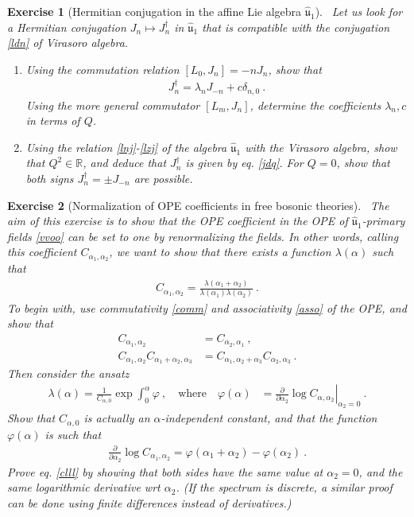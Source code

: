 \documentclass[12pt, a4paper, notitlepage, twoside]{report}
\numberwithin{equation}{section}
\theoremstyle{break}
\newtheorem{exo}{Exercise}[chapter]
\begin{document}
\begin{exo}[Hermitian conjugation in the affine Lie algebra $\hat{\mathfrak{u}}_1$]
~\label{exocuo}
Let us look for a Hermitian conjugation $J_n\mapsto J_n^\dagger$ in $\hat{\mathfrak{u}}_1$ that is compatible with the conjugation \eqref{ldn} of Virasoro algebra.
\begin{enumerate}
 \item Using the commutation relation $[L_0,J_n]=-nJ_n$, show that 
 \begin{align}
  J_n^\dagger =\lambda_n J_{-n} + c\delta_{n,0}\ .
 \end{align}
Using the more general commutator $[L_m,J_n]$, determine the coefficients $\lambda_n,c$ in terms of $Q$. 
\item 
Using the relation \eqref{lnj}-\eqref{lzj} of the algebra $\hat{\mathfrak{u}}_1$ with the Virasoro algebra, show that $Q^2\in\mathbb{R}$, and deduce that $J_n^\dagger$ is given by eq. \eqref{jdq}. For $Q=0$, show that both signs $J_n^\dagger = \pm J_{-n}$ are possible.
\end{enumerate}

\end{exo}


\begin{exo}[Normalization of OPE coefficients in free bosonic theories]
 ~\label{exoone}
The aim of this exercise is to show that the OPE coefficient in the OPE of $\hat{\mathfrak{u}}_1$-primary fields \eqref{vvoo} can be set to one by renormalizing the fields.
In other words, calling this coefficient $C_{\alpha_1,\alpha_2}$, we want to show that there exists a function $\lambda(\alpha)$ such that 
\begin{align}
 C_{\alpha_1,\alpha_2} = \frac{\lambda(\alpha_1+\alpha_2)}{\lambda(\alpha_1)\lambda(\alpha_2)}\ .
\label{clll}
\end{align}
To begin with, 
use commutativity \eqref{comm} and associativity \eqref{asso} of the OPE, and show that 
\begin{align}
C_{\alpha_1,\alpha_2} &= C_{\alpha_2,\alpha_1}\ ,
\\
 C_{\alpha_1,\alpha_2}C_{\alpha_1+\alpha_2,\alpha_3} &= C_{\alpha_1,\alpha_2+\alpha_3}C_{\alpha_2,\alpha_3}\ .
\end{align}
Then consider the ansatz
\begin{align}
  \lambda(\alpha) = \frac{1}{C_{\alpha,0}} \exp \int_0^{\alpha} \varphi \ , \quad \text{where}\quad  
 \varphi(\alpha)&=\left.{\frac{\partial}{\partial \alpha_2}}\log C_{\alpha,\alpha_2}\right|_{\alpha_2=0}\ .
\end{align}
Show that $C_{\alpha,0}$ is actually an $\alpha$-independent constant, and that the function $\varphi(\alpha)$ is such that
\begin{align}
 {\frac{\partial}{\partial \alpha_2}} \log C_{\alpha_1,\alpha_2}  = \varphi(\alpha_1+\alpha_2)-\varphi(\alpha_2)\ . 
\end{align}
Prove eq. \eqref{clll} by showing that both sides have the same value at $\alpha_2=0$, and the same logarithmic derivative wrt $\alpha_2$. 
(If the spectrum is discrete, a similar proof can be done using finite differences instead of derivatives.) 
\end{exo}
\end{document}
